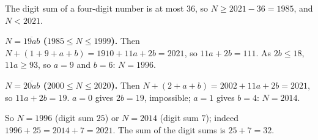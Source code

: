 The digit sum of a four-digit number is at most $36$, so $N\ge2021-36=1985$, and $N<2021$.

\textbf{$N=\overline{19ab}$ ($1985\le N\le1999$).} Then $N+(1+9+a+b)=1910+11a+2b=2021$, so $11a+2b=111$. As $2b\le18$, $11a\ge93$, so $a=9$ and $b=6$: $N=1996$.

\textbf{$N=\overline{20ab}$ ($2000\le N\le2020$).} Then $N+(2+a+b)=2002+11a+2b=2021$, so $11a+2b=19$. $a=0$ gives $2b=19$, impossible; $a=1$ gives $b=4$: $N=2014$.

So $N=1996$ (digit sum $25$) or $N=2014$ (digit sum $7$); indeed $1996+25=2014+7=2021$. The sum of the digit sums is $25+7=\boxed{32}$.
